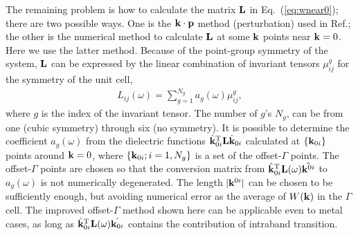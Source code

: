 \documentclass[a4paper,10pt,fleqn]{article}
\def\bfp{{\bf p}}
\newcommand{\bfzero}{{\bf 0}}
\newcommand{\bfq}{{\bf q}}
\newcommand{\bfk}{{\bf k}}
\newcommand{\req}[1]{\mbox{Eq.~(\ref{#1})}}
\begin{document}


The remaining problem is how to calculate
the matrix ${\bf L}$ in \req{eq:wnear0}; there are two possible ways.
One is the $\bfk \cdot \bfp$ method (perturbation) used in Ref.\cite{friedrich_efficient_2010}; 
the other is the numerical method to calculate ${\bf L}$ at some
$\bfk$ points near $\bfk=0$. Here we use the latter method.
Because of the point-group symmetry of the system, ${\bf L}$ can be expressed by the
linear combination of invariant tensors $\mu_{ij}^g$ for the symmetry of the unit cell,
\begin{eqnarray}
L_{ij}(\omega)=  \sum_{g=1}^{N_g} a_g(\omega) \mu_{ij}^g,
\end{eqnarray}
where $g$ is the index of the invariant tensor. 
The number of $g$'s $N_g$, can be
from one (cubic symmetry) through six (no symmetry).
It is possible to determine the coefficient $a_g(\omega)$
from the dielectric functions ${\hat{\bfk}_{0i}}^{\rm T}{\bf L}\hat{\bfk}_{0i}$
calculated at $\{\bfk_{0i}\}$ points around
$\bfk=0$, where $\{\bfk_{0i}; i=1,N_g\}$ is a set of the offset-$\Gamma$ points.
The offset-$\Gamma$ points are chosen so that the conversion matrix
from $\hat{\bfk}_{0i}^{\rm T}{\bf L}(\omega)\hat{\bfk^{0i}}$ to $a_g(\omega)$
is not numerically degenerated. The length $|\bfk^{0i}|$
can be chosen to be sufficiently enough, but avoiding numerical error
%
as the average of $W(\bfk)$ in the $\Gamma$ cell.
The improved offset-$\Gamma$ method shown here can be applicable even to metal cases, as long as
$\hat{\bfk}_{0i}^{\rm T}{\bf L}(\omega)\hat{\bfk_{0i}}$ contains the contribution
of intraband transition.
\end{document}
